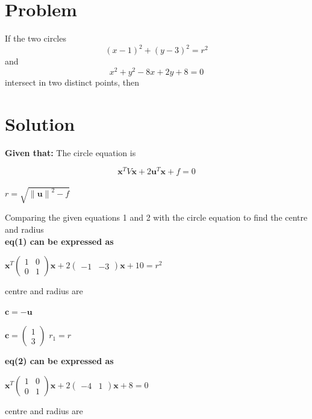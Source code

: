 \documentclass[10pt, a4paper]{article}
\let\vec\mathbf
\begin{document}
\title{\mytitle}
\author{\myauthor\hspace{1em}\\\contact\\FWC220\hspace{6.5em}IITH\hspace{0.5em}\mymodule\hspace{6em}Matrix:Circle}

\date{}
\maketitle


  \section{Problem}
If the two circles $$ (x- 1)^2+(y-3)^2=r^2 $$ and\\
$$x^2+y^2-8x+2y+8=0$$ intersect in two distinct points, then 
\section{Solution}
\textbf{Given that:}
The circle equation is\\
\begin{center}
$$\vec{x}^{T}V\vec{x}+2\vec{u}^{T}\vec{x}+f=0$$\\
$r=\sqrt{\left \| \vec{u} \right \|^{2}-f}$
\end{center}
Comparing the given equations 1 and 2 with the circle equation to find the centre and radius\\
\textbf{eq(1) can be expressed as}\\
\begin{center}
$\vec{x}^{T}$$\begin{pmatrix}
1 & 0\\ 
 0 & 1
\end{pmatrix}\vec{x}+2\begin{pmatrix}
-1 & -3
\end{pmatrix}\vec{x}+10=r^{2}$
\end{center}
centre and radius are\\

\begin{center}
$\vec{c}=\vec{-u}$

$\vec{c}=\begin{pmatrix}
1\\ 
3
\end{pmatrix} $
$r_{1}=r$
\end{center} 
\textbf{eq(2) can be expressed as}\\
\begin{center}
$\vec{x}^{T}$$\begin{pmatrix}
1 & 0\\ 
 0 & 1
\end{pmatrix}\vec{x}+2\begin{pmatrix}
-4 & 1
\end{pmatrix}\vec{x}+8=0$
\end{center}
centre  and radius are\\
\end{document}
